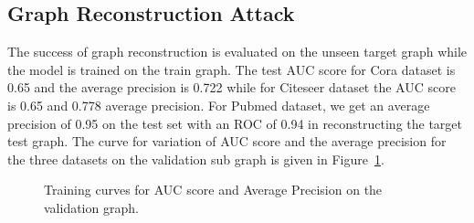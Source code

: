 \subsection{Graph Reconstruction Attack}

The success of graph reconstruction is evaluated on the unseen target graph while the model is trained on the train graph.
The test AUC score for Cora dataset is 0.65 and the average precision is 0.722 while for Citeseer dataset the AUC score is 0.65 and 0.778 average precision.
For Pubmed dataset, we get an average precision of 0.95 on the test set with an ROC of 0.94 in reconstructing the target test graph.
The curve for variation of AUC score and the average precision for the three datasets on the validation sub graph is given in Figure~\ref{fig:valgraphrecon}.

\begin{figure}[!htb]
    \centering
    \begin{minipage}[b]{1\linewidth}
    \centering
    \end{minipage}
    \caption{Training curves for AUC score and Average Precision on the validation graph.}
    \label{fig:valgraphrecon}
\end{figure}

